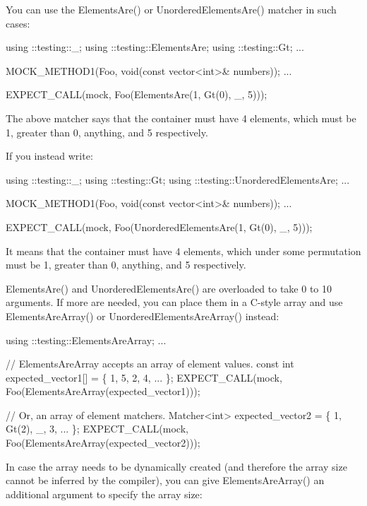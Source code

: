 You can use the {\ttfamily Elements\+Are()} or {\ttfamily Unordered\+Elements\+Are()} matcher in such cases\+:


\begin{DoxyCode}
using ::testing::\_;
using ::testing::ElementsAre;
using ::testing::Gt;
...

  MOCK\_METHOD1(Foo, \textcolor{keywordtype}{void}(\textcolor{keyword}{const} vector<int>& numbers));
...

  EXPECT\_CALL(mock, Foo(ElementsAre(1, Gt(0), \_, 5)));
\end{DoxyCode}


The above matcher says that the container must have 4 elements, which must be 1, greater than 0, anything, and 5 respectively.

If you instead write\+:


\begin{DoxyCode}
using ::testing::\_;
using ::testing::Gt;
using ::testing::UnorderedElementsAre;
...

  MOCK\_METHOD1(Foo, \textcolor{keywordtype}{void}(\textcolor{keyword}{const} vector<int>& numbers));
...

  EXPECT\_CALL(mock, Foo(UnorderedElementsAre(1, Gt(0), \_, 5)));
\end{DoxyCode}


It means that the container must have 4 elements, which under some permutation must be 1, greater than 0, anything, and 5 respectively.

{\ttfamily Elements\+Are()} and {\ttfamily Unordered\+Elements\+Are()} are overloaded to take 0 to 10 arguments. If more are needed, you can place them in a C-\/style array and use {\ttfamily Elements\+Are\+Array()} or {\ttfamily Unordered\+Elements\+Are\+Array()} instead\+:


\begin{DoxyCode}
using ::testing::ElementsAreArray;
...

  \textcolor{comment}{// ElementsAreArray accepts an array of element values.}
  \textcolor{keyword}{const} \textcolor{keywordtype}{int} expected\_vector1[] = \{ 1, 5, 2, 4, ... \};
  EXPECT\_CALL(mock, Foo(ElementsAreArray(expected\_vector1)));

  \textcolor{comment}{// Or, an array of element matchers.}
  Matcher<int> expected\_vector2 = \{ 1, Gt(2), \_, 3, ... \};
  EXPECT\_CALL(mock, Foo(ElementsAreArray(expected\_vector2)));
\end{DoxyCode}


In case the array needs to be dynamically created (and therefore the array size cannot be inferred by the compiler), you can give {\ttfamily Elements\+Are\+Array()} an additional argument to specify the array size\+:



